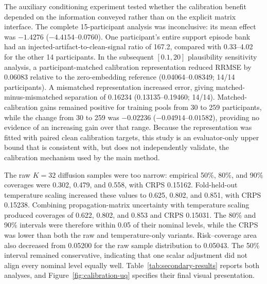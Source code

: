 The auxiliary conditioning experiment tested whether the calibration benefit depended on the information conveyed rather than on the explicit matrix interface. The complete 15-participant analysis was inconclusive: its mean effect was $-1.4276$ ($-4.4154$--$0.0760$). One participant's entire support episode bank had an injected-artifact-to-clean-signal ratio of 167.2, compared with 0.33--4.02 for the other 14 participants. In the subsequent $[0.1,20]$ plausibility sensitivity analysis, a participant-matched calibration representation reduced RRMSE by 0.06083 relative to the zero-embedding reference (0.04064--0.08349; 14/14 participants). A mismatched representation increased error, giving matched-minus-mismatched separation of 0.16234 (0.13135--0.19460; 14/14). Matched-calibration gains remained positive for training pools from 30 to 259 participants, while the change from 30 to 259 was $-0.02236$ ($-0.04914$--$0.01582$), providing no evidence of an increasing gain over that range. Because the representation was fitted with paired clean calibration targets, this study is an evaluator-only upper bound that is consistent with, but does not independently validate, the calibration mechanism used by the main method.

The raw $K=32$ diffusion samples were too narrow: empirical 50\%, 80\%, and 90\% coverages were 0.302, 0.479, and 0.558, with CRPS 0.15162. Fold-held-out temperature scaling increased these values to 0.625, 0.802, and 0.851, with CRPS 0.15238. Combining propagation-matrix uncertainty with temperature scaling produced coverages of 0.622, 0.802, and 0.853 and CRPS 0.15031. The 80\% and 90\% intervals were therefore within 0.05 of their nominal levels, while the CRPS was lower than both the raw and temperature-only variants. Risk--coverage area also decreased from 0.05200 for the raw sample distribution to 0.05043. The 50\% interval remained conservative, indicating that one scalar adjustment did not align every nominal level equally well. Table~\ref{tab:secondary-results} reports both analyses, and Figure~\ref{fig:calibration-uq} specifies their final visual presentation.

